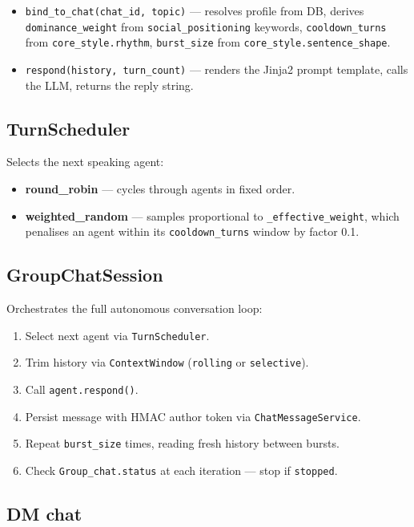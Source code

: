 \documentclass[12pt,a4paper]{article}
\begin{document}
\begin{itemize}
  \item \texttt{bind\_to\_chat(chat\_id, topic)} --- resolves profile from DB, derives
        \texttt{dominance\_weight} from \texttt{social\_positioning} keywords,
        \texttt{cooldown\_turns} from \texttt{core\_style.rhythm},
        \texttt{burst\_size} from \texttt{core\_style.sentence\_shape}.
  \item \texttt{respond(history, turn\_count)} --- renders the Jinja2 prompt template,
        calls the LLM, returns the reply string.
\end{itemize}

\subsection{TurnScheduler}

Selects the next speaking agent:
\begin{itemize}
  \item \textbf{round\_robin} --- cycles through agents in fixed order.
  \item \textbf{weighted\_random} --- samples proportional to \texttt{\_effective\_weight},
        which penalises an agent within its \texttt{cooldown\_turns} window by factor 0.1.
\end{itemize}

\subsection{GroupChatSession}

Orchestrates the full autonomous conversation loop:
\begin{enumerate}
  \item Select next agent via \texttt{TurnScheduler}.
  \item Trim history via \texttt{ContextWindow} (\texttt{rolling} or \texttt{selective}).
  \item Call \texttt{agent.respond()}.
  \item Persist message with HMAC author token via \texttt{ChatMessageService}.
  \item Repeat \texttt{burst\_size} times, reading fresh history between bursts.
  \item Check \texttt{Group\_chat.status} at each iteration --- stop if \texttt{stopped}.
\end{enumerate}

\subsection{DM chat}
\end{document}
